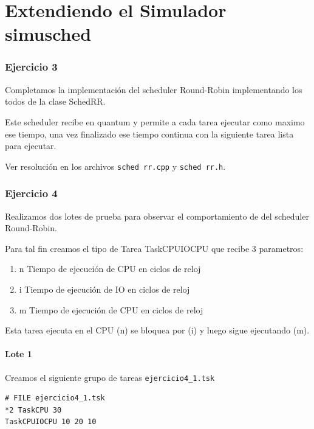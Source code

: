 


\part{Extendiendo el Simulador simusched}

\section{Ejercicio 3}

Completamos la implementaci\'on del scheduler Round-Robin implementando los todos de la clase SchedRR.

Este scheduler recibe en quantum y permite a cada tarea ejecutar como maximo ese tiempo, una vez finalizado ese tiempo continua con la siguiente tarea lista para ejecutar.

Ver resoluci\'on en los archivos \verb|sched rr.cpp| y \verb|sched rr.h|.

\section{Ejercicio 4}

Realizamos dos lotes de prueba para observar el comportamiento de del scheduler Round-Robin.

Para tal fin creamos el tipo de Tarea TaskCPUIOCPU que recibe 3 parametros:

\begin{enumerate}
 \item n Tiempo de ejecuci\'on de CPU en ciclos de reloj
 \item i Tiempo de ejecuci\'on de IO en ciclos de reloj
 \item m Tiempo de ejecuci\'on de CPU en ciclos de reloj
\end{enumerate}

Esta tarea ejecuta en el CPU (n) se bloquea por (i) y luego sigue ejecutando (m).

\subsection{Lote 1}

Creamos el siguiente grupo de tareas \verb|ejercicio4_1.tsk|

\begin{framed}
\begin{verbatim}
# FILE ejercicio4_1.tsk
*2 TaskCPU 30
TaskCPUIOCPU 10 20 10
\end{verbatim}
\end{framed}

